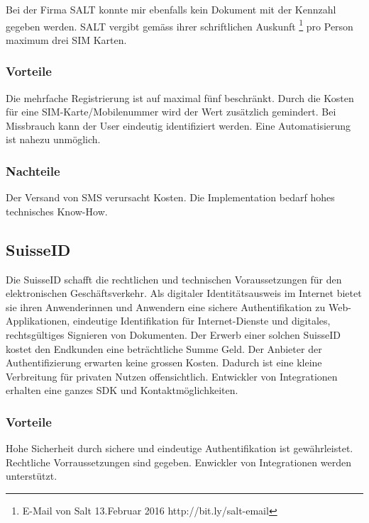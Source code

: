 Bei der Firma SALT konnte mir ebenfalls kein Dokument mit der Kennzahl
gegeben werden. SALT vergibt gemäss ihrer schriftlichen Auskunft
\footnote{E-Mail von Salt 13.Februar 2016 http://bit.ly/salt-email} pro
Person maximum drei SIM Karten.

\subsubsection{Vorteile}\label{vorteile-2}

Die mehrfache Registrierung ist auf maximal fünf beschränkt. Durch die
Kosten für eine SIM-Karte/Mobilenummer wird der Wert zusätzlich
gemindert. Bei Missbrauch kann der User eindeutig identifiziert werden.
Eine Automatisierung ist nahezu unmöglich.

\subsubsection{Nachteile}\label{nachteile-2}

Der Versand von SMS verursacht Kosten. Die Implementation bedarf hohes
technisches Know-How.

\hypertarget{suisseid}{\subsection{SuisseID}\label{suisseid}}

Die SuisseID schafft die rechtlichen und technischen Voraussetzungen für
den elektronischen Geschäftsverkehr. Als digitaler Identitätsausweis im
Internet bietet sie ihren Anwenderinnen und Anwendern eine sichere
Authentifikation zu Web-Applikationen, eindeutige Identifikation für
Internet-Dienste und digitales, rechtsgültiges Signieren von Dokumenten.
Der Erwerb einer solchen SuisseID kostet den Endkunden eine
beträchtliche Summe Geld. Der Anbieter der Authentifizierung erwarten
keine grossen Kosten. Dadurch ist eine kleine Verbreitung für privaten
Nutzen offensichtlich. Entwickler von Integrationen erhalten eine ganzes
SDK und Kontaktmöglichkeiten.

\subsubsection{Vorteile}\label{vorteile-3}

Hohe Sicherheit durch sichere und eindeutige Authentifikation ist
gewährleistet. Rechtliche Vorraussetzungen sind gegeben. Enwickler von
Integrationen werden unterstützt.

